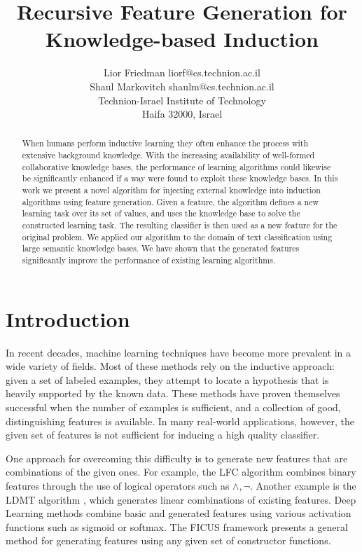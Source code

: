\documentclass[twoside,11pt]{article}
\title{Recursive Feature Generation for Knowledge-based Induction}
\author{\name Lior Friedman \email liorf@cs.technion.ac.il \\
	\name Shaul Markovitch \email shaulm@cs.technion.ac.il \\
	\addr Technion-Israel Institute of Technology\\
	Haifa 32000, Israel
}
\theoremstyle{definition}
\begin{document}
	
\maketitle
	
\begin{abstract}
	When humans perform inductive learning they often enhance the process with extensive background knowledge.
	With the increasing availability of well-formed collaborative knowledge bases, the performance of learning algorithms could likewise
	 be significantly enhanced if a way were found to exploit these knowledge bases. 
	In this work we present a novel algorithm for injecting external knowledge into induction algorithms using feature generation. Given a feature, the algorithm defines a new learning task over its set of values, and uses the knowledge base to solve the constructed learning task. The resulting classifier is then used as a new feature for the original problem.
	We applied our algorithm to the domain of text classification using large semantic knowledge bases. We have shown that the generated features significantly improve the performance of existing learning algorithms.
\end{abstract}

\section{Introduction}
\label{sec:Intro}
In recent decades, machine learning techniques have become more prevalent in a wide variety of fields. %
Most of these methods rely on the inductive approach: given a set of labeled examples, they attempt to locate a hypothesis that is heavily supported by the known data. These methods have proven themselves successful when the number of examples is sufficient, and a collection of good,
distinguishing features is available.
In many real-world applications, however, the given set of features is not sufficient for inducing a high quality classifier.

One approach for overcoming this difficulty is to generate new features that are combinations of the given ones.
For example, the LFC algorithm  combines binary features through the use of logical operators such as $\land ,\lnot$.
Another example is the LDMT algorithm \cite{utgo1991linear}, which generates linear combinations of existing features.
Deep Learning methods combine basic and generated features using various activation functions such as sigmoid or softmax.
The FICUS framework \cite{markovitch2002feature} presents a general method for generating features using any given set of constructor functions.
\end{document}
